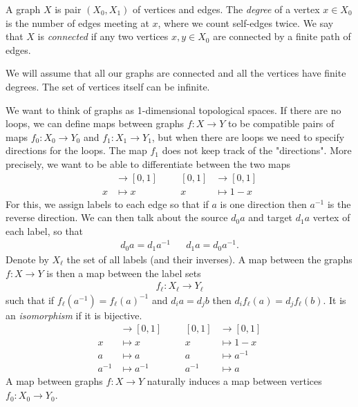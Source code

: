   A graph $X$ is pair $(X_0,X_1)$ of vertices and edges.
  The \emph{degree} of a vertex $x \in X_0$ is the number of edges meeting at $x$, where we count self-edges twice.
  We say that $X$ is \emph{connected} if any two vertices $x,y \in X_0$ are connected by a finite path of edges.
  \begin{mdframed}
    We will assume that all our graphs are connected and all the vertices have finite degrees.
    The set of vertices itself can be infinite.
  \end{mdframed}

  We want to think of graphs as 1-dimensional topological spaces.
  If there are no loops, we can define maps between graphs $f:X \rightarrow Y$ to be compatible pairs of maps $f_0:X_0 \rightarrow Y_0$ and $f_1:X_1 \rightarrow Y_1$, but when there are loops we need to specify directions for the loops. The map $f_1$ does not keep track of the "directions".
  More precisely, we want to be able to differentiate between the two maps
  \begin{align*}
    [0,1] &\rightarrow [0,1] &&& [0,1] &\rightarrow [0,1] \\
    x &\mapsto x &&& x&\mapsto1-x
  \end{align*}
  For this, we assign labels to each edge so that if $a$ is one direction then $a^{-1}$ is the reverse direction.
  We can then talk about the source $d_0 a$ and target $d_1 a$ vertex of each label, so that
  \begin{align*}
    d_0 a = d_1 a^{-1} && d_1 a = d_0 a^{-1}.
  \end{align*}
  Denote by $X_{\ell}$ the set of all labels (and their inverses).
  A map between the graphs $f:X \rightarrow Y$ is then a map between the label sets
  \begin{align*}
    f_\ell: X_\ell \rightarrow Y_\ell
  \end{align*}
  such that if $f_\ell(a^{-1}) = f_\ell(a)^{-1}$ and $d_i a = d_j b$ then $d_i f_\ell(a) = d_j f_\ell(b)$.
  It is an \emph{isomorphism} if it is bijective.
  \begin{align*}
    [0,1] &\rightarrow [0,1] &&& [0,1] &\rightarrow [0,1] \\
    x &\mapsto x &&& x&\mapsto1-x \\
    a &\mapsto a &&& a&\mapsto a^{-1} \\
    a^{-1} &\mapsto a^{-1} &&& a^{-1}&\mapsto a
  \end{align*}
  A map between graphs $f: X \rightarrow Y$ naturally induces a map between vertices $f_0 : X_0 \rightarrow Y_0$.
